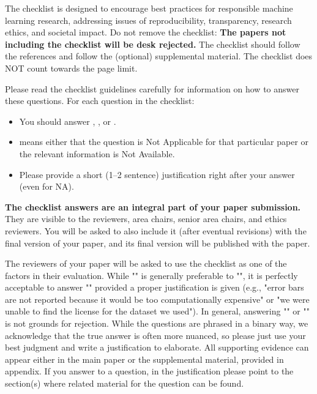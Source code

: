 \documentclass{article}
\begin{document}
The checklist is designed to encourage best practices for responsible machine learning research, addressing issues of reproducibility, transparency, research ethics, and societal impact. Do not remove the checklist: {\bf The papers not including the checklist will be desk rejected.} The checklist should follow the references and follow the (optional) supplemental material.  The checklist does NOT count towards the page
limit.

Please read the checklist guidelines carefully for information on how to answer these questions. For each question in the checklist:
\begin{itemize}
    \item You should answer \answerYes{}, \answerNo{}, or \answerNA{}.
    \item \answerNA{} means either that the question is Not Applicable for that particular paper or the relevant information is Not Available.
    \item Please provide a short (1–2 sentence) justification right after your answer (even for NA).
\end{itemize}

{\bf The checklist answers are an integral part of your paper submission.} They are visible to the reviewers, area chairs, senior area chairs, and ethics reviewers. You will be asked to also include it (after eventual revisions) with the final version of your paper, and its final version will be published with the paper.

The reviewers of your paper will be asked to use the checklist as one of the factors in their evaluation. While "\answerYes{}" is generally preferable to "\answerNo{}", it is perfectly acceptable to answer "\answerNo{}" provided a proper justification is given (e.g., "error bars are not reported because it would be too computationally expensive" or "we were unable to find the license for the dataset we used"). In general, answering "\answerNo{}" or "\answerNA{}" is not grounds for rejection. While the questions are phrased in a binary way, we acknowledge that the true answer is often more nuanced, so please just use your best judgment and write a justification to elaborate. All supporting evidence can appear either in the main paper or the supplemental material, provided in appendix. If you answer \answerYes{} to a question, in the justification please point to the section(s) where related material for the question can be found.
\end{document}
